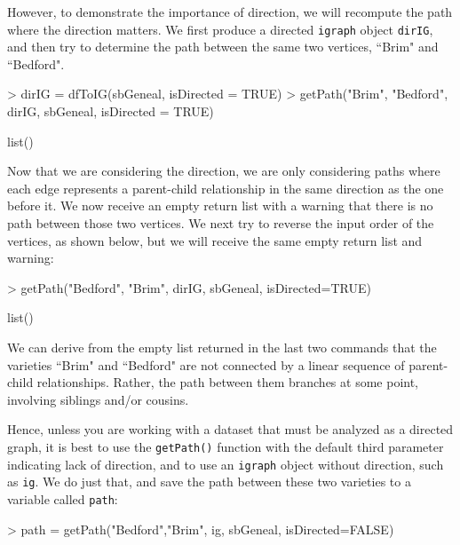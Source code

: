 \documentclass{article}
\numberwithin{equation}{section} %
\begin{document}
However, to demonstrate the importance of direction, we will recompute the path where the direction matters. We first produce a directed \texttt{igraph} object \texttt{dirIG}, and then try to determine the path between the same two vertices, ``Brim" and ``Bedford".

\begin{Schunk}
\begin{Sinput}
> dirIG = dfToIG(sbGeneal, isDirected = TRUE)
> getPath("Brim", "Bedford", dirIG, sbGeneal, isDirected = TRUE)
\end{Sinput}
\begin{Soutput}
list()
\end{Soutput}
\end{Schunk}

Now that we are considering the direction, we are only considering paths where each edge represents a parent-child relationship in the same direction as the one before it. We now receive an empty return list with a warning that there is no path between those two vertices. We  next try to reverse the input order of the vertices, as shown below, but we will receive the same empty return list and warning:

\begin{Schunk}
\begin{Sinput}
> getPath("Bedford", "Brim", dirIG, sbGeneal, isDirected=TRUE)
\end{Sinput}
\begin{Soutput}
list()
\end{Soutput}
\end{Schunk}

We can derive from the empty list returned in the last two commands that the varieties ``Brim" and ``Bedford" are not connected by a linear sequence of parent-child relationships. Rather, the path between them branches at some point, involving siblings and/or cousins.

Hence, unless you are working with a dataset that must be analyzed as a directed graph, it is best to use the \texttt{getPath()} function with the default third parameter indicating lack of direction, and to use an \texttt{igraph} object without direction, such as \texttt{ig}. We do just that, and save the path between these two varieties to a variable called \texttt{path}:

\begin{Schunk}
\begin{Sinput}
> path = getPath("Bedford","Brim", ig, sbGeneal, isDirected=FALSE)
\end{Sinput}
\end{Schunk}
\end{document}
